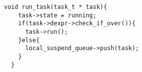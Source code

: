   \begin{lstlisting}[mathescape]
  void run_task(task_t * task){
    task->state = running;
    if(task->dexpr->check_if_over()){
      task->run();
    }else{
      local_suspend_queue->push(task);
    }
  }
  \end{lstlisting}
